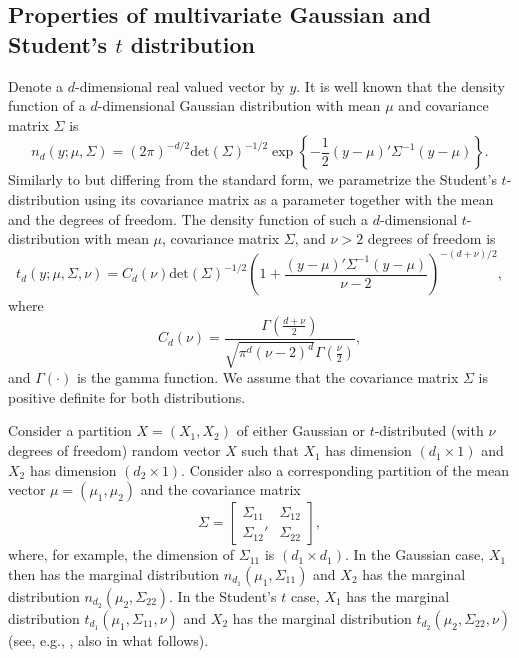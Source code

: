 \documentclass[nojss]{jss} %
\begin{document}
\begin{appendix}
\section{Properties of multivariate Gaussian and Student's $t$ distribution}\label{ap:propt}
Denote a $d$-dimensional real valued vector by $y$.  It is well known that the density function of a $d$-dimensional Gaussian distribution with mean $\mu$ and covariance matrix $\Sigma$ is
\begin{equation}
n_d(y;\mu,\Sigma) = (2\pi)^{-d/2}\text{det}(\Sigma)^{-1/2}\exp\left\lbrace -\frac{1}{2}(y -\mu)'\Sigma^{-1}(y - \mu) \right\rbrace .
\end{equation}
Similarly to \cite{Meitz+Preve+Saikkonen:2021} but differing from the standard form, we parametrize the Student's $t$-distribution using its covariance matrix as a parameter together with the mean and the degrees of freedom. The density function of such a $d$-dimensional $t$-distribution with mean $\mu$, covariance matrix $\Sigma$, and $\nu>2$ degrees of freedom is
\begin{equation}
t_d(y;\mu,\Sigma,\nu)=C_d(\nu)\text{det}(\Sigma)^{-1/2}\left(1+\frac{(y -\mu)'\Sigma^{-1}(y - \mu)}{\nu-2}\right)^{-(d+\nu)/2},
\end{equation}
where
\begin{equation}
C_d(\nu)=\frac{\Gamma\left(\frac{d+\nu}{2}\right)}{\sqrt{\pi^d(\nu-2)^d}\Gamma\left(\frac{\nu}{2}\right)},
\end{equation}
and $\Gamma\left(\cdot\right)$ is the gamma function.  We assume that the covariance matrix $\Sigma$ is positive definite for both distributions.

Consider a partition $X=(X_1,X_2)$ of either Gaussian or $t$-distributed (with $\nu$ degrees of freedom) random vector $X$ such that $X_1$ has dimension $(d_1\times1)$ and $X_2$ has dimension $(d_2\times1)$. Consider also a corresponding partition of the mean vector $\mu=(\mu_1,\mu_2)$ and the covariance matrix
\begin{equation}
\Sigma=
\begin{bmatrix}
\Sigma_{11} & \Sigma_{12} \\
\Sigma_{12}' & \Sigma_{22}
\end{bmatrix},
\end{equation}
where, for example, the dimension of $\Sigma_{11}$ is $(d_1\times d_1)$.  In the Gaussian case, $X_1$ then has the marginal distribution $n_{d_1}(\mu_1,\Sigma_{11})$ and $X_2$ has the marginal distribution $n_{d_2}(\mu_2,\Sigma_{22})$.  In the Student's $t$ case,  $X_1$ has the marginal distribution $t_{d_1}(\mu_1,\Sigma_{11},\nu)$ and $X_2$ has the marginal distribution $t_{d_2}(\mu_2,\Sigma_{22},\nu)$ (see, e.g., \cite{Ding:2016}, also in what follows).


\end{appendix}
\end{document}
